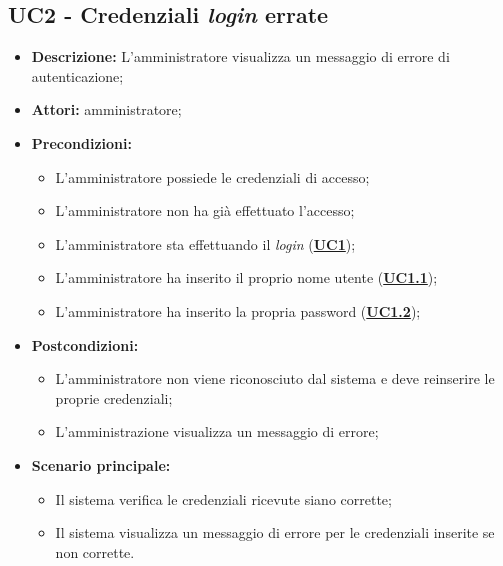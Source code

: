 \subsection{UC2 - Credenziali \textit{login} errate}
\label{sec:UC2}
\begin{itemize}
	\item \textbf{Descrizione:} L’amministratore visualizza un messaggio di errore di autenticazione;
	\item \textbf{Attori:} amministratore;
	\item \textbf{Precondizioni:} 
	\begin{itemize}
		\item L’amministratore possiede le credenziali di accesso;
		\item L’amministratore non ha già effettuato l’accesso;
		\item L’amministratore sta effettuando il \textit{login} (\hyperref[sec:UC1]{\textbf{UC1}});
		\item L’amministratore ha inserito il proprio nome utente (\hyperref[sec:UC1.1]{\textbf{UC1.1}});
		\item L’amministratore ha inserito la propria password (\hyperref[sec:UC1.2]{\textbf{UC1.2}});
	\end{itemize}
	\item \textbf{Postcondizioni:}
	\begin{itemize}
		\item L’amministratore non viene riconosciuto dal sistema e deve reinserire le proprie credenziali;
		\item L'amministrazione visualizza un messaggio di errore;
	\end{itemize}
	\item \textbf{Scenario principale:} 
	\begin{itemize}
		\item Il sistema verifica le credenziali ricevute siano corrette;
		\item Il sistema visualizza un messaggio di errore per le credenziali inserite se non corrette.
	\end{itemize}
\end{itemize}

